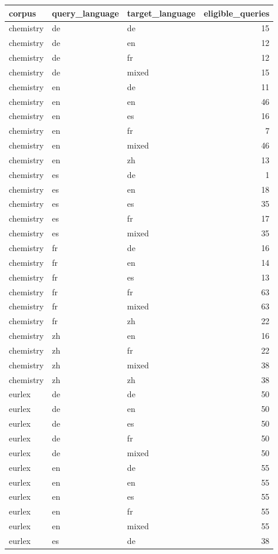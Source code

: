 \begin{tabular}{lllr}
\toprule
corpus & query\_language & target\_language & eligible\_queries \\
\midrule
chemistry & de & de & 15 \\
chemistry & de & en & 12 \\
chemistry & de & fr & 12 \\
chemistry & de & mixed & 15 \\
chemistry & en & de & 11 \\
chemistry & en & en & 46 \\
chemistry & en & es & 16 \\
chemistry & en & fr & 7 \\
chemistry & en & mixed & 46 \\
chemistry & en & zh & 13 \\
chemistry & es & de & 1 \\
chemistry & es & en & 18 \\
chemistry & es & es & 35 \\
chemistry & es & fr & 17 \\
chemistry & es & mixed & 35 \\
chemistry & fr & de & 16 \\
chemistry & fr & en & 14 \\
chemistry & fr & es & 13 \\
chemistry & fr & fr & 63 \\
chemistry & fr & mixed & 63 \\
chemistry & fr & zh & 22 \\
chemistry & zh & en & 16 \\
chemistry & zh & fr & 22 \\
chemistry & zh & mixed & 38 \\
chemistry & zh & zh & 38 \\
eurlex & de & de & 50 \\
eurlex & de & en & 50 \\
eurlex & de & es & 50 \\
eurlex & de & fr & 50 \\
eurlex & de & mixed & 50 \\
eurlex & en & de & 55 \\
eurlex & en & en & 55 \\
eurlex & en & es & 55 \\
eurlex & en & fr & 55 \\
eurlex & en & mixed & 55 \\
eurlex & es & de & 38 \\

\end{tabular}
